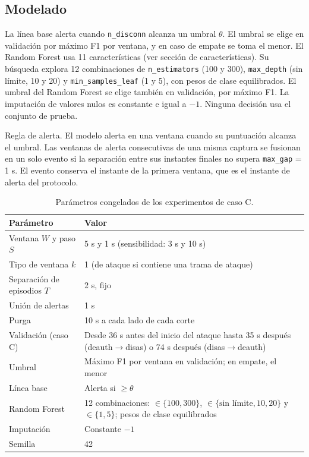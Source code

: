 \documentclass[journal]{IEEEtran}
\begin{document}
\subsection{Modelado}

La línea base alerta cuando \texttt{n\_disconn} alcanza un umbral $\theta$. El umbral se elige en validación por máximo F1 por ventana, y en caso de empate se toma el menor. El Random Forest usa 11 características (ver sección de características). Su búsqueda explora 12 combinaciones de \texttt{n\_estimators} (100 y 300), \texttt{max\_depth} (sin límite, 10 y 20) y \texttt{min\_samples\_leaf} (1 y 5), con pesos de clase equilibrados. El umbral del Random Forest se elige también en validación, por máximo F1. La imputación de valores nulos es constante e igual a $-1$. Ninguna decisión usa el conjunto de prueba.

Regla de alerta. El modelo alerta en una ventana cuando su puntuación alcanza el umbral. Las ventanas de alerta consecutivas de una misma captura se fusionan en un solo evento si la separación entre sus instantes finales no supera \texttt{max\_gap} = 1 s. El evento conserva el instante de la primera ventana, que es el instante de alerta del protocolo.
\begin{table}[t]
\caption{Parámetros congelados de los experimentos de caso C.}
\label{tab:parametros}
\centering
\footnotesize
\begin{tabularx}{\textwidth}{p{4.1cm}Y}
\hline
Parámetro & Valor \\
\hline
Ventana $W$ y paso $S$ & 5 s y 1 s (sensibilidad: 3 s y 10 s) \\
Tipo de ventana $k$ & 1 (de ataque si contiene una trama de ataque) \\
Separación de episodios $T$ & 2 s, fijo \\
Unión de alertas  & 1 s \\
Purga & 10 s a cada lado de cada corte \\
Validación (caso C) & Desde 36 s antes del inicio del ataque hasta 35 s después (deauth$\rightarrow$disas) o 74 s después (disas$\rightarrow$deauth) \\
Umbral & Máximo F1 por ventana en validación; en empate, el menor \\
Línea base & Alerta si  $\geq \theta$ \\
Random Forest & 12 combinaciones:  $\in \{100, 300\}$,  $\in \{\text{sin límite}, 10, 20\}$ y  $\in \{1, 5\}$; pesos de clase equilibrados \\
Imputación & Constante $-1$ \\
Semilla & 42 \\
\hline
\end{tabularx}
\end{table}
\end{document}
